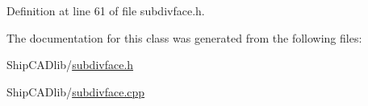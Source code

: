 Definition at line 61 of file subdivface.\-h.



The documentation for this class was generated from the following files\-:\begin{DoxyCompactItemize}
\item 
Ship\-C\-A\-Dlib/\hyperlink{subdivface_8h}{subdivface.\-h}\item 
Ship\-C\-A\-Dlib/\hyperlink{subdivface_8cpp}{subdivface.\-cpp}\end{DoxyCompactItemize}
